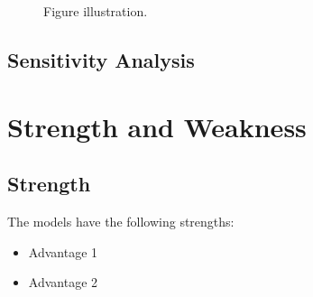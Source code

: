 \documentclass[12pt,a4paper]{article}
\begin{document}
\begin{spacing}{1.2}
\begin{figure}[H]
\caption{Figure illustration.}
\label{Figure_Flyer}
\end{figure}



\subsection{Sensitivity Analysis}


\section{Strength and Weakness}
\label{Strength_Weakness}


\subsection{Strength}

The models have the following strengths:

\begin{itemize}
\item Advantage 1

\item Advantage 2
\end{itemize}



\end{spacing}
\end{document}
